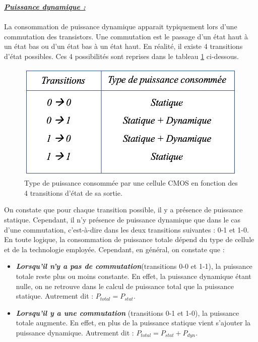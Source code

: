 \documentclass[10pt, oneside, a4paper]{article}
\begin{document}
\hspace{-0.5 cm}

\underline{\textbf{\textit{Puissance dynamique :}}} \\ \\
La consommation de puissance dynamique apparait typiquement lors d'une commutation des transistors. Une commutation est le passage d'un état haut à un état bas ou d'un état bas à un état haut. En réalité, il existe 4 transitions d'état possibles. Ces 4 possibilités sont reprises dans le tableau \ref{fig:dyn} ci-dessous. 
\begin{figure}[htbp]
    \centering
    \includegraphics[scale=0.4]{image/dyn}
    \caption{Type de puissance consommée par une cellule CMOS en fonction des 4 transitions d'état de sa sortie.}
    \label{fig:dyn} 
\end{figure}

\hspace{-0.5 cm}On constate que pour chaque transition possible, il y a présence de puissance statique. Cependant, il n'y présence de puissance dynamique que dans le cas d'une commutation, c'est-à-dire dans les deux transitions suivantes : 0-1 et 1-0.  En toute logique, la consommation de puissance totale dépend du type de cellule et de la technologie employée. Cependant, en général, on constate que : 
\begin{itemize}
\item \textbf{\textit{Lorsqu'il n'y a pas de commutation}}(transitions 0-0 et 1-1), la puissance totale reste plus ou moins constante. En effet, la puissance dynamique étant nulle, on ne retrouve dans le calcul de puissance total que la puissance statique. Autrement dit : $P_{total}=P_{stat}$.
\item \textbf{\textit{Lorsqu'il y a une commutation}} (transitions 0-1 et 1-0), la puissance totale augmente. En effet, en plus de la puissance statique vient s'ajouter la puissance dynamique. Autrement dit : $P_{total}=P_{stat}+P_{dyn}$.
\end{itemize}
\end{document}

